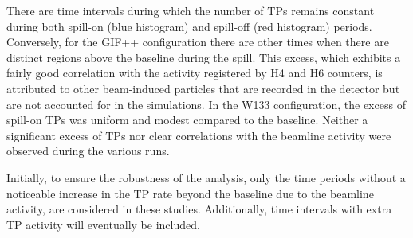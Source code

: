 There are time intervals during which the number of TPs remains constant during both spill-on (blue histogram) and spill-off (red histogram) periods. Conversely, for the GIF++ configuration there are other times when there are distinct regions above the baseline during the spill. This excess, which exhibits a fairly good correlation with the activity registered by H4 and H6 counters, is attributed to other beam-induced particles that are recorded in the detector but are not accounted for in the simulations. In the W133 configuration, the excess of spill-on TPs was uniform and modest compared to the baseline. Neither a significant excess of TPs nor clear correlations with the beamline activity were observed during the various runs.

Initially, to ensure the robustness of the analysis, only the time periods without a noticeable increase in the TP rate beyond the baseline due to the beamline activity, are considered in these studies. Additionally, time intervals with extra TP activity will eventually be included. %



